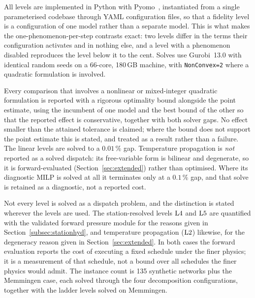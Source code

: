 
All levels are implemented in Python with Pyomo~\cite{pyomo}, instantiated from a single
parameterised codebase through YAML configuration files, so that a fidelity level is a
configuration of one model rather than a separate model. This is what makes the
one-phenomenon-per-step contrasts exact: two levels differ in the terms their configuration
activates and in nothing else, and a level with a phenomenon disabled reproduces the level
below it to the cent. Solves use Gurobi~13.0 with identical random seeds on a 66-core,
180\,GB machine, with \texttt{NonConvex=2} where a quadratic formulation is involved.

Every comparison that involves a nonlinear or mixed-integer quadratic formulation is reported
with a rigorous optimality bound alongside the point estimate, using the incumbent of one model
and the best bound of the other so that the reported effect is conservative, together with both
solver gaps. No effect smaller than the attained tolerance is claimed; where the bound does not
support the point estimate this is stated, and treated as a result rather than a failure. The
linear levels are solved to a $0.01$\,\% gap. Temperature propagation is \emph{not} reported as
a solved dispatch: its free-variable form is bilinear and degenerate, so it is forward-evaluated
(Section~\ref{sec:extended}) rather than optimised. Where its diagnostic MILP is solved at all it
terminates only at a $0.1$\,\% gap, and that solve is retained as a diagnostic, not a reported
cost.

Not every level is solved as a dispatch problem, and the distinction is stated wherever the
levels are used. The station-resolved levels $\mathrm{L4}$ and $\mathrm{L5}$ are quantified with the
validated forward pressure module for the reasons given in
Section~\ref{subsec:stationhyd}, and temperature propagation ($\mathrm{L2}$) likewise, for the
degeneracy reason given in Section~\ref{sec:extended}. In both cases the forward evaluation
reports the cost of executing a fixed schedule under the finer physics; it is a measurement
of that schedule, not a bound over all schedules the finer physics would admit. The instance
count is 135 synthetic networks plus the Memmingen case, each solved through the four
decomposition configurations, together with the ladder levels solved on Memmingen.
